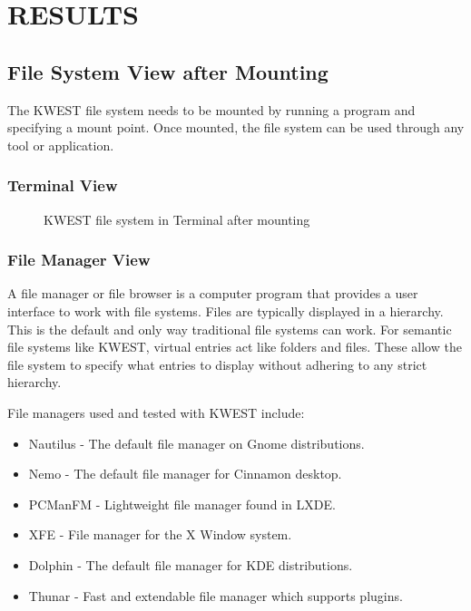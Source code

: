 \chapter {RESULTS}

\section{File System View after Mounting}
The KWEST file system needs to be mounted by running a program and specifying a mount point. Once mounted, the file system can be used through any tool or application.
\subsection{Terminal View}
\begin{figure}[htb]
\centering
\setlength\fboxsep{0pt}
\setlength\fboxrule{0.5pt}
\caption{KWEST file system in Terminal after mounting}
\label{fig:dfd0}
\end{figure}

\subsection{File Manager View}
A file manager or file browser is a computer program that provides a user interface to work with file systems. Files are typically displayed in a hierarchy. This is the default and only way traditional file systems can work. For semantic file systems like KWEST, virtual entries act like folders and files. These allow the file system to specify what entries to display without adhering to any strict hierarchy.

File managers used and tested with KWEST include: 
\begin{itemize}
\item Nautilus - The default file manager on Gnome distributions.
\item Nemo - The default file manager for Cinnamon desktop.
\item PCManFM - Lightweight file manager found in LXDE.
\item XFE - File manager for the X Window system.
\item Dolphin - The default file manager for KDE distributions.
\item Thunar - Fast and extendable file manager which supports plugins.
\end{itemize}


